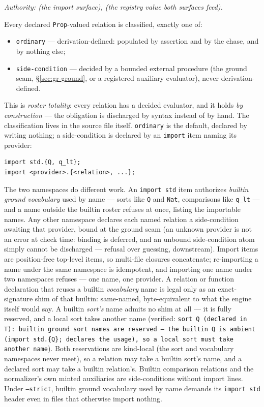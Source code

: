 \emph{Authority: 
(the import surface), 
(the registry value both surfaces feed).}

Every declared \texttt{Prop}-valued relation is classified, exactly
one of:

\begin{itemize}
\item \texttt{ordinary} — derivation-defined: populated by assertion
and by the chase, and by nothing else;
\item \texttt{side-condition} — decided by a bounded external
procedure (the ground seam, \S\ref{sec:gr-ground}, or a registered
auxiliary evaluator), never derivation-defined.
\end{itemize}

\noindent This is \emph{roster totality}: every relation has a
decided evaluator, and it holds \emph{by construction} — the
obligation is discharged by syntax instead of by hand. The
classification lives in the source file itself. \texttt{ordinary} is
the default, declared by writing nothing; a side-condition is
declared by an \texttt{import} item naming its provider:

\begin{Verbatim}[fontsize=\small,frame=leftline,rulecolor=\color{accentmid},framesep=3mm,xleftmargin=3mm]
import std.{Q, q_lt};
import <provider>.{<relation>, ...};
\end{Verbatim}

\noindent The two namespaces do different work. An
\texttt{import std} item authorizes \emph{builtin ground vocabulary}
used by name — sorts like \texttt{Q} and \texttt{Nat}, comparisons
like \texttt{q\_lt} — and a name outside the builtin roster refuses
at once, listing the importable names. Any other namespace declares
each named relation a side-condition awaiting that provider, bound
at the ground seam (an unknown provider is not an error at check
time: binding is deferred, and an unbound side-condition atom simply
cannot be discharged — refusal over guessing, downstream). Import
items are position-free top-level items, so multi-file closures
concatenate; re-importing a name under the same namespace is
idempotent, and importing one name under two namespaces refuses ---
one name, one provider. A relation or function declaration that
reuses a builtin \emph{vocabulary} name is legal only as an
exact-signature shim of that builtin: same-named, byte-equivalent to
what the engine itself would say. A builtin \emph{sort's} name admits
no shim at all — it is fully reserved, and a local sort takes another
name (verified: \texttt{sort Q (declared in T): builtin ground sort
names are reserved — the builtin Q is ambient (import std.\{Q\};
declares the usage), so a local sort must take another name}). Both
reservations are kind-local (the sort and vocabulary namespaces never
meet), so a relation may take a builtin sort's name, and a declared
sort may take a builtin relation's. Builtin
comparison relations and the normalizer's own minted auxiliaries are
side-conditions without import lines. Under \texttt{--strict},
builtin ground vocabulary used by name demands its \texttt{import
std} header even in files that otherwise import nothing.

